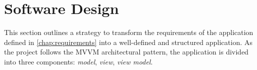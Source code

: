 \section{Software Design}
This section outlines a strategy to transform the requirements of the application defined in \autoref{chap:requirements} into a well-defined and structured application.
As the project follows the MVVM architectural pattern, the application is divided into three components: \emph{model}, \emph{view}, \emph{view model}. 



